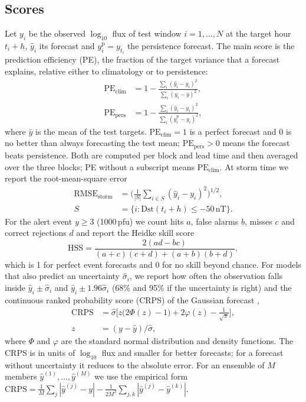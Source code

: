 \documentclass[a4paper,fleqn]{cas-dc}
\newcommand{\PE}{\mathrm{PE}}
\begin{document}
\subsection{Scores}
\label{sec:scores}
Let \(y_{i}\) be the observed \(\log_{10}\) flux of test window \(i=1,\dots,N\) at the target hour \(t_i+h\),
\(\hat y_i\) its forecast and \(y^{\mathrm p}_i=y_{t_i}\) the persistence forecast. The main score is the prediction
efficiency (PE), the fraction of the target variance that a forecast explains, relative either to climatology or
to persistence:
\begin{align}
\PE_{\mathrm{clim}} &= 1-\frac{\sum_i(\hat y_i-y_i)^2}{\sum_i(y_i-\bar y)^2}, \label{eq:peclim}\\
\PE_{\mathrm{pers}} &= 1-\frac{\sum_i(\hat y_i-y_i)^2}{\sum_i(y^{\mathrm p}_i-y_i)^2}, \label{eq:pepers}
\end{align}
where \(\bar y\) is the mean of the test targets. \(\PE_{\mathrm{clim}}=1\) is a perfect forecast and 0 is no better
than always forecasting the test mean; \(\PE_{\mathrm{pers}}>0\) means the forecast beats persistence. Both are
computed per block and lead time and then averaged over the three blocks; PE without a subscript means
\(\PE_{\mathrm{clim}}\). At storm time we report the root-mean-square error
\begin{equation}
\begin{aligned}
\mathrm{RMSE}_{\mathrm{storm}}&=\Big(\tfrac{1}{|S|}\textstyle\sum_{i\in S}(\hat y_i-y_i)^2\Big)^{1/2},\\
S&=\{i:\mathrm{Dst}(t_i+h)\le-50\,\mathrm{nT}\}.
\end{aligned} \label{eq:rmse}
\end{equation}
For the alert event \(y\ge3\) (1000\,pfu) we count hits \(a\), false alarms \(b\), misses \(c\) and correct
rejections \(d\) and report the Heidke skill score \citep{jolliffe2011}
\begin{equation}
\mathrm{HSS}=\frac{2(ad-bc)}{(a+c)(c+d)+(a+b)(b+d)}, \label{eq:hss}
\end{equation}
which is 1 for perfect event forecasts and 0 for no skill beyond chance. For models that also predict an
uncertainty \(\hat\sigma_i\), we report how often the observation falls inside \(\hat y_i\pm\hat\sigma_i\) and
\(\hat y_i\pm1.96\hat\sigma_i\) (68\% and 95\% if the uncertainty is right) and the continuous ranked probability
score (CRPS) of the Gaussian forecast \citep{gneiting2007},
\begin{equation}
\begin{aligned}
\mathrm{CRPS}&=\hat\sigma\Big[z\big(2\Phi(z)-1\big)+2\varphi(z)-\tfrac{1}{\sqrt\pi}\Big],\\
z&=(y-\hat y)/\hat\sigma,
\end{aligned} \label{eq:crps}
\end{equation}
where \(\Phi\) and \(\varphi\) are the standard normal distribution and density functions. The CRPS is in units of
\(\log_{10}\) flux and smaller for better forecasts; for a forecast without uncertainty it reduces to the absolute
error. For an ensemble of \(M\) members \(\hat y^{(1)},\dots,\hat y^{(M)}\) we use the empirical form
\(\mathrm{CRPS}=\frac1M\sum_j|\hat y^{(j)}-y|-\frac1{2M^2}\sum_{j,k}|\hat y^{(j)}-\hat y^{(k)}|\).
\end{document}

